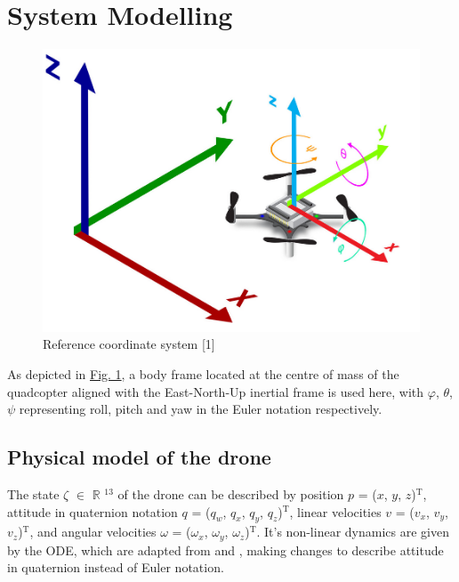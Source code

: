 \documentclass[conference]{IEEEtran}
\begin{document}
\section{System Modelling}\label{Section2}
\begin{figure}[htbp]
	\centerline{\includegraphics[scale = 0.4]{figures/ordinate.png} }
	\caption{Reference coordinate system [1]}
	\label{Fig1}
\end{figure}
As depicted in \hyperref[Fig1]{Fig. 1}, a body frame located at the centre of mass of the quadcopter aligned with the East-North-Up inertial frame is used here, with $\varphi$, $\theta$, $\psi$ representing roll, pitch and yaw in the Euler notation respectively.

\subsection{Physical model of the drone}
The state $\zeta$ $\in$ $\mathbb{R}$ $\mathrm{^{13}}$ of the drone can be described by position $p$ = ($x$, $y$, $z$)$\mathrm{^{T}}$, attitude in quaternion notation $q$ = ($q_{w}$, $q_{x}$, $q_{y}$, $q_{z}$)$\mathrm{^{T}}$, linear velocities $v$ = ($v_x$, $v_y$, $v_z$)$\mathrm{^{T}}$, and angular velocities $\omega$ = ($\omega_x$, $\omega_y$, $\omega_z$)$\mathrm{^{T}}$. It's non-linear dynamics are given by the ODE, which are adapted from \cite{carlos_efficient_2020} and \cite{Luis_2016}, making changes to describe attitude in quaternion instead of Euler notation.\\
\end{document}
